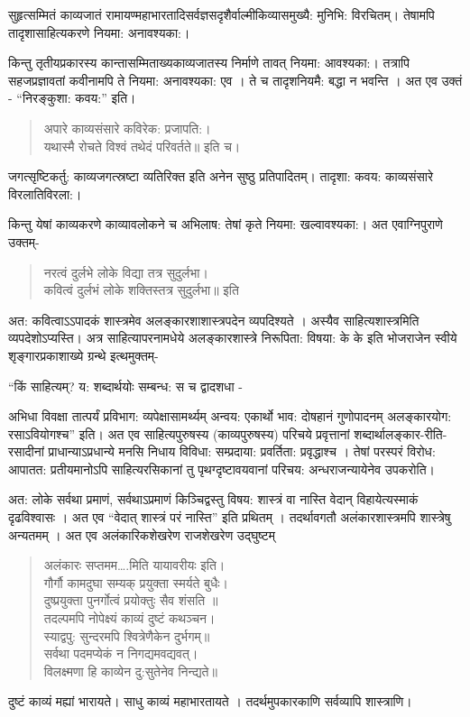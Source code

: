 सुहृत्सम्मितं काव्यजातं रामायण्महाभारतादिसर्वज्ञसदृशैर्वाल्मीकिव्यासमुख्यै: मुनिभि: विरचितम्। तेषामपि तादृशासाहित्यकरणे नियमा: अनावश्यका:।

किन्तु तृतीयप्रकारस्य कान्तासम्मिताख्यकाव्यजातस्य निर्माणे तावत् नियमा: आवश्यका:। तत्रापि सहजप्रज्ञावतां कवीनामपि ते नियमा: अनावश्यका: एव । ते च तादृशनियमै: बद्धा न भवन्ति ।  अत एव उक्तं - “निरङ्कुशा: कवय:” इति।
\begin{verse}
अपारे काव्यसंसारे कविरेक: प्रजापति:।\\
यथास्मै रोचते विश्वं तथेदं परिवर्तते॥ इति च।
\end{verse}
जगत्सृष्टिकर्तु: काव्यजगत्स्रष्टा व्यतिरिक्त इति अनेन सुष्ठु प्रतिपादितम्। तादृशा: कवय: काव्यसंसारे विरलातिविरला:।

किन्तु येषां काव्यकरणे काव्यावलोकने च अभिलाष: तेषां कृते नियमा: खल्वावश्यका:। अत एवाग्निपुराणे उक्तम्-
\begin{verse}
नरत्वं दुर्लभे लोके विद्या तत्र सुदुर्लभा।\\
कवित्वं दुर्लभं लोके शक्तिस्तत्र सुदुर्लभा॥ इति
\end{verse}
अत: कवित्वाऽऽपादकं शास्त्रमेव अलङ्कारशाशास्त्रपदेन व्यपदिश्यते । अस्यैव साहित्यशास्त्रमिति व्यपदेशोऽप्यस्ति। अत्र साहित्यापरनामधेये अलङ्कारशास्त्रे निरूपिता: विषया: के के इति भोजराजेन स्वीये शृङ्गारप्रकाशाख्ये ग्रन्थे इत्थमुक्तम्-

“किं साहित्यम्? य: शब्दार्थयोः सम्बन्ध: स च द्वादशधा -

अभिधा विवक्षा तात्पर्यं प्रविभाग: व्यपेक्षासामर्थ्यम् अन्वय: एकार्थो भाव: दोषहानं गुणोपादनम् अलङ्कारयोग: रसाऽवियोगश्च” इति। अत एव साहित्यपुरुषस्य (काव्यपुरुषस्य) परिचये प्रवृत्तानां शब्दार्थालङ्कार-रीति-रसादीनां प्राधान्याऽप्रधान्ये मनसि निधाय विविधा: सम्प्रदाया: प्रवर्तिता: प्रवृद्धाश्च । तेषां परस्परं विरोध: आपातत: प्रतीयमानोऽपि साहित्यरसिकानां तु पृथग्दृष्टावयवानां  परिचय: अन्धराजन्यायेनेव उपकरोति।

अत: लोके सर्वथा प्रमाणं, सर्वथाऽप्रमाणं किञ्चिद्वस्तु विषय: शास्त्रं वा नास्ति वेदान् विहायेत्यस्माकं दृढविश्वासः । अत एव “वेदात् शास्त्रं परं नास्ति” इति प्रथितम् । तदर्थावगतौ अलंकारशास्त्रमपि शास्त्रेषु अन्यतमम् । अत एव अलंकारिकशेखरेण राजशेखरेण उद्घुष्टम् 
\begin{verse}
अलंकारः सप्तमम….मिति यायावरीयः इति।\\
गौर्गौ कामदुघा सम्यक् प्रयुक्ता स्मर्यते बुधैः।\\
दुष्प्रयुक्ता पुनर्गोत्वं प्रयोक्तुः सैव शंसति ॥\\
तदल्पमपि नोपेक्ष्यं काव्यं दुष्टं कथञ्चन।\\
स्याद्वपु: सुन्दरमपि श्वित्रेणैकेन दुर्भगम्॥\\
सर्वथा पदमप्येकं न निगद्यमवद्यवत्।\\
विलक्ष्मणा हि काव्येन दु:सुतेनेव निन्द्यते॥
\end{verse}
दुष्टं काव्यं मह्यां भारायते। साधु काव्यं महाभारतायते । तदर्थमुपकारकाणि सर्वव्यापि शास्त्राणि।


